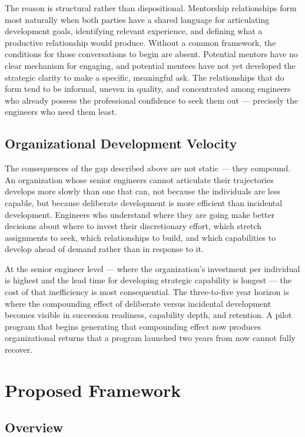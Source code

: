 \documentclass{article}
\begin{document}
The reason is structural rather than dispositional. Mentorship relationships form most naturally when both parties have a shared 
language for articulating development goals, identifying relevant experience, and defining what a productive relationship would produce. 
Without a common framework, the conditions for those conversations to begin are absent. Potential mentors have no clear mechanism for engaging,
and potential mentees have not yet developed the strategic clarity to make a specific, meaningful ask. The relationships that do form tend to 
be informal, uneven in quality, and concentrated among engineers who already possess the professional confidence to seek them out — precisely 
the engineers who need them least.

\subsection{Organizational Development Velocity}

The consequences of the gap described above are not static — they compound. An organization whose senior engineers cannot articulate their 
trajectories develops more slowly than one that can, not because the individuals are less capable, but because deliberate development is 
more efficient than incidental development. Engineers who understand where they are going make better decisions about where to invest their 
discretionary effort, which stretch assignments to seek, which relationships to build, and which capabilities to develop ahead of demand 
rather than in response to it.

At the senior engineer level — where the organization's investment per individual is highest and the lead time for developing strategic 
capability is longest — the cost of that inefficiency is most consequential. The three-to-five year horizon is where the compounding 
effect of deliberate versus incidental development becomes visible in succession readiness, capability depth, and retention. A pilot 
program that begins generating that compounding effect now produces organizational returns that a program launched two years from 
now cannot fully recover.

\section{Proposed Framework}

\subsection{Overview}
\end{document}
